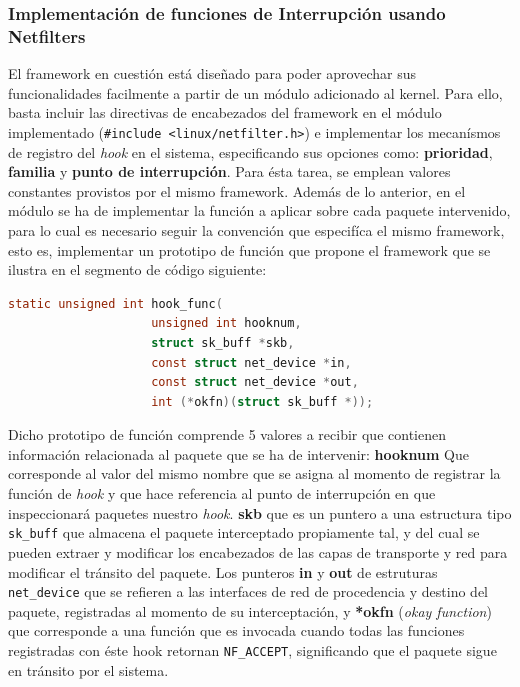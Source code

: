 \subsubsection{Implementación de funciones de Interrupción usando Netfilters}

El framework en cuestión está diseñado para poder aprovechar sus funcionalidades facilmente a partir de un módulo adicionado al kernel. Para ello, basta incluir las directivas de encabezados del framework en el módulo implementado (\verb=#include <linux/netfilter.h>=) e implementar los mecanísmos de registro del \emph{hook} en el sistema, especificando sus opciones como: \textbf{prioridad}, \textbf{familia} y \textbf{punto de interrupción}. Para ésta tarea, se emplean valores constantes provistos por el mismo framework. Además de lo anterior, en el módulo se ha de implementar la función a aplicar sobre cada paquete intervenido, para lo cual es necesario seguir la convención que especifíca el mismo framework, esto es, implementar un prototipo de función que propone el framework que se ilustra en el segmento de código siguiente:

\begin{lstlisting}[language=C, frame=single, backgroundcolor=\color{mygray}, captionpos=b, caption=ESO]
static unsigned int hook_func(
            		unsigned int hooknum,
            		struct sk_buff *skb, 
            		const struct net_device *in, 
            		const struct net_device *out, 
            		int (*okfn)(struct sk_buff *));
\end{lstlisting}

Dicho prototipo de función comprende 5 valores a recibir que contienen información relacionada al paquete que se ha de intervenir: \textbf{hooknum} Que corresponde al valor del mismo nombre que se asigna al momento de registrar la función de \emph{hook} y que hace referencia al punto de interrupción en que inspeccionará paquetes nuestro \emph{hook}. \textbf{skb} que es un puntero a una estructura tipo \verb=sk_buff= que almacena el paquete interceptado propiamente tal, y del cual se pueden extraer y modificar los encabezados de las capas de transporte y red para modificar el tránsito del paquete. Los punteros \textbf{in} y \textbf{out} de estruturas \verb=net_device= que se refieren a las interfaces de red de procedencia y destino del paquete, registradas al momento de su interceptación, y \textbf{*okfn} (\emph{okay function}) que corresponde a una función que es invocada cuando todas las funciones registradas con éste hook retornan \verb=NF_ACCEPT=, significando que el paquete sigue en tránsito por el sistema.


